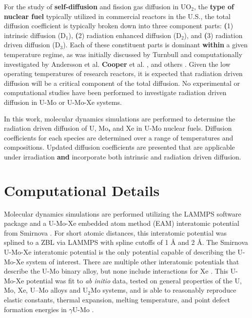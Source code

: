 \documentclass[review]{elsarticle}
\providecommand{\DIFaddtex}[1]{{\bf #1}} %
\providecommand{\DIFdeltex}[1]{} %
\providecommand{\DIFaddbegin}{\protect\color{blue}} %
\providecommand{\DIFaddend}{\protect\color{black}} %
\providecommand{\DIFdelbegin}{\protect\color{red}} %
\providecommand{\DIFdelend}{\protect\color{black}} %
\providecommand{\DIFadd}[1]{\texorpdfstring{\DIFaddtex{#1}}{#1}} %
\providecommand{\DIFdel}[1]{\texorpdfstring{\DIFdeltex{#1}}{}} %
\newcommand{\DIFscaledelfig}{0.5}
\newlength{\DIFdelgraphicswidth} %
\newlength{\DIFdelgraphicsheight} %
\newcommand{\DIFaddincludegraphics}[2][]{{\color{blue}\fbox{\DIFOincludegraphics[#1]{#2}}}} %
\newcommand{\DIFdelincludegraphics}[2][]{%
\sbox{\DIFdelgraphicsbox}{\DIFOincludegraphics[#1]{#2}}%
\settoboxwidth{\DIFdelgraphicswidth}{\DIFdelgraphicsbox} %
\settoboxtotalheight{\DIFdelgraphicsheight}{\DIFdelgraphicsbox} %
\scalebox{\DIFscaledelfig}{%
\parbox[b]{\DIFdelgraphicswidth}{\usebox{\DIFdelgraphicsbox}\\[-\baselineskip] \rule{\DIFdelgraphicswidth}{0em}}\llap{\resizebox{\DIFdelgraphicswidth}{\DIFdelgraphicsheight}{%
\setlength{\unitlength}{\DIFdelgraphicswidth}%
\begin{picture}(1,1)%
\thicklines\linethickness{2pt} %
{\color[rgb]{1,0,0}\put(0,0){\framebox(1,1){}}}%
{\color[rgb]{1,0,0}\put(0,0){\line( 1,1){1}}}%
{\color[rgb]{1,0,0}\put(0,1){\line(1,-1){1}}}%
\end{picture}%
}\hspace*{3pt}}} %
} %
\DeclareRobustCommand{\DIFaddbegin}{\DIFOaddbegin \let\includegraphics\DIFaddincludegraphics} %
\DeclareRobustCommand{\DIFaddend}{\DIFOaddend \let\includegraphics\DIFOincludegraphics} %
\DeclareRobustCommand{\DIFdelbegin}{\DIFOdelbegin \let\includegraphics\DIFdelincludegraphics} %
\DeclareRobustCommand{\DIFdelend}{\DIFOaddend \let\includegraphics\DIFOincludegraphics} %
\begin{document}
For the study of \DIFdelbegin \DIFdel{self- }\DIFdelend \DIFaddbegin \DIFadd{self-diffusion }\DIFaddend and fission gas diffusion in UO$_2$, the \DIFdelbegin \DIFdel{nuclear fuel type }\DIFdelend \DIFaddbegin \DIFadd{type of nuclear fuel }\DIFaddend typically utilized in commercial reactors in the U.S., the total diffusion coefficient is typically broken down into three component parts: \DIFaddbegin \DIFadd{(}\DIFaddend 1) intrinsic diffusion (D$_1$), \DIFaddbegin \DIFadd{(}\DIFaddend 2) radiation enhanced diffusion (D$_2$), and \DIFaddbegin \DIFadd{(}\DIFaddend 3) radiation driven diffusion (D$_3$). Each of these constituent parts is dominant \DIFdelbegin \DIFdel{in }\DIFdelend \DIFaddbegin \DIFadd{within }\DIFaddend a given temperature regime, as was initially discussed by Turnbull \cite{turnbull1982} and computationally investigated by Andersson \DIFdelbegin \DIFdel{, }\DIFdelend et al. \cite{andersson2014} \DIFdelbegin \DIFdel{and Cooper , }\DIFdelend \DIFaddbegin \DIFadd{Cooper }\DIFaddend et al. \cite{cooper2016}, and others \cite{matthews_cluster_2019, perriot_atomistic_2019, wormald2015, martin2009}. Given the low operating temperatures of research reactors, it is expected that radiation driven diffusion will be a critical component of the total diffusion. No experimental or computational studies have been performed to investigate radiation driven diffusion in U-Mo or U-Mo-Xe systems.

In this work, molecular dynamics simulations are performed to determine the radiation driven diffusion of U, Mo\DIFaddbegin \DIFadd{, }\DIFaddend and Xe in U-Mo nuclear fuels. Diffusion coefficients for each species are determined over a range of temperatures and compositions. Updated diffusion coefficients are presented that are applicable under irradiation \DIFdelbegin \DIFdel{that }\DIFdelend \DIFaddbegin \DIFadd{and }\DIFaddend incorporate both intrinsic and radiation driven diffusion. 

\section{Computational Details}

Molecular dynamics simulations are performed utilizing the LAMMPS \cite{plimpton1995} software package and a U-Mo-Xe embedded atom method (EAM) interatomic potential from Smirnova \cite{smirnovaUMo}. For short atomic distances, this interatomic potential was splined to a ZBL \cite{zbl} via LAMMPS with spline cutoffs of 1 {\AA} and 2 {\AA}. The Smirnova U-Mo-Xe interatomic potential is the only potential capable of describing the U-Mo-Xe system of interest. There are multiple other interatomic potentials that describe the U-Mo binary alloy, but none include interactions for Xe \cite{smirnovaADP, starikov2018}. This U-Mo-Xe potential was fit to \textit{ab initio} data, tested on general properties of the U, Mo, Xe, U–Mo alloys and U$_2$Mo systems, and is able to reasonably reproduce elastic constants, thermal expansion, melting temperature, and point defect formation energies in $\gamma$U-Mo \cite{smirnovaUMo}.
\end{document}
